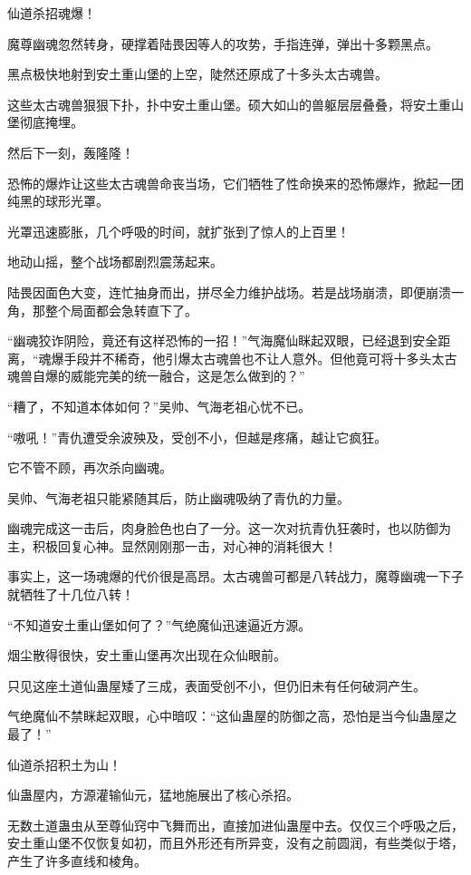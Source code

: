 \begin{this_body}
仙道杀招魂爆！

魔尊幽魂忽然转身，硬撑着陆畏因等人的攻势，手指连弹，弹出十多颗黑点。

黑点极快地射到安土重山堡的上空，陡然还原成了十多头太古魂兽。

这些太古魂兽狠狠下扑，扑中安土重山堡。硕大如山的兽躯层层叠叠，将安土重山堡彻底掩埋。

然后下一刻，轰隆隆！

恐怖的爆炸让这些太古魂兽命丧当场，它们牺牲了性命换来的恐怖爆炸，掀起一团纯黑的球形光罩。

光罩迅速膨胀，几个呼吸的时间，就扩张到了惊人的上百里！

地动山摇，整个战场都剧烈震荡起来。

陆畏因面色大变，连忙抽身而出，拼尽全力维护战场。若是战场崩溃，即便崩溃一角，那整个局面都会急转直下了。

“幽魂狡诈阴险，竟还有这样恐怖的一招！”气海魔仙眯起双眼，已经退到安全距离，“魂爆手段并不稀奇，他引爆太古魂兽也不让人意外。但他竟可将十多头太古魂兽自爆的威能完美的统一融合，这是怎么做到的？”

“糟了，不知道本体如何？”吴帅、气海老祖心忧不已。

“嗷吼！”青仇遭受余波殃及，受创不小，但越是疼痛，越让它疯狂。

它不管不顾，再次杀向幽魂。

吴帅、气海老祖只能紧随其后，防止幽魂吸纳了青仇的力量。

幽魂完成这一击后，肉身脸色也白了一分。这一次对抗青仇狂袭时，也以防御为主，积极回复心神。显然刚刚那一击，对心神的消耗很大！

事实上，这一场魂爆的代价很是高昂。太古魂兽可都是八转战力，魔尊幽魂一下子就牺牲了十几位八转！

“不知道安土重山堡如何了？”气绝魔仙迅速逼近方源。

烟尘散得很快，安土重山堡再次出现在众仙眼前。

只见这座土道仙蛊屋矮了三成，表面受创不小，但仍旧未有任何破洞产生。

气绝魔仙不禁眯起双眼，心中暗叹：“这仙蛊屋的防御之高，恐怕是当今仙蛊屋之最了！”

仙道杀招积土为山！

仙蛊屋内，方源灌输仙元，猛地施展出了核心杀招。

无数土道蛊虫从至尊仙窍中飞舞而出，直接加进仙蛊屋中去。仅仅三个呼吸之后，安土重山堡不仅恢复如初，而且外形还有所异变，没有之前圆润，有些类似于塔，产生了许多直线和棱角。


\end{this_body}
